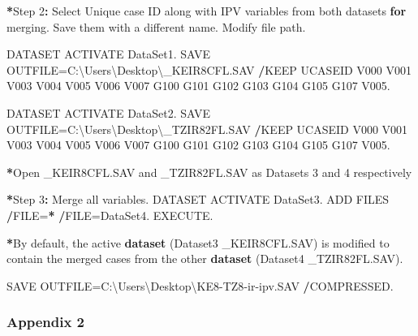 \documentclass[
]{article}
\newenvironment{Shaded}{\begin{snugshade}}{\end{snugshade}}
\newcommand{\ControlFlowTok}[1]{\textcolor[rgb]{0.13,0.29,0.53}{\textbf{#1}}}
\newcommand{\DecValTok}[1]{\textcolor[rgb]{0.00,0.00,0.81}{#1}}
\newcommand{\ErrorTok}[1]{\textcolor[rgb]{0.64,0.00,0.00}{\textbf{#1}}}
\newcommand{\FunctionTok}[1]{\textcolor[rgb]{0.13,0.29,0.53}{\textbf{#1}}}
\newcommand{\NormalTok}[1]{#1}
\newcommand{\OtherTok}[1]{\textcolor[rgb]{0.56,0.35,0.01}{#1}}
\newcommand{\SpecialCharTok}[1]{\textcolor[rgb]{0.81,0.36,0.00}{\textbf{#1}}}
\newcommand{\StringTok}[1]{\textcolor[rgb]{0.31,0.60,0.02}{#1}}
\begin{document}
\begin{Shaded}
\begin{Highlighting}[]
\SpecialCharTok{*}\NormalTok{Step }\DecValTok{2}\SpecialCharTok{:}\NormalTok{ Select Unique case ID along with IPV variables from both datasets }\ControlFlowTok{for}\NormalTok{ merging. Save them with a different name. Modify file path.}

\NormalTok{DATASET ACTIVATE DataSet1.}
\NormalTok{SAVE OUTFILE}\OtherTok{=}\StringTok{\textquotesingle{}C:\textbackslash{}Users\textbackslash{}Desktop\textbackslash{}\_KEIR8CFL.SAV\textquotesingle{}}
  \SpecialCharTok{/}\NormalTok{KEEP UCASEID V000 V001 V003 V004 V005 V006 V007 G100 G101 G102 G103 G104 G105 G107 V005.}

\NormalTok{DATASET ACTIVATE DataSet2.}
\NormalTok{SAVE OUTFILE}\OtherTok{=}\StringTok{\textquotesingle{}C:\textbackslash{}Users\textbackslash{}Desktop\textbackslash{}\_TZIR82FL.SAV\textquotesingle{}}
  \SpecialCharTok{/}\NormalTok{KEEP UCASEID V000 V001 V003 V004 V005 V006 V007 G100 G101 G102 G103 G104 G105 G107 V005.}

\SpecialCharTok{*}\NormalTok{Open \_KEIR8CFL.SAV and \_TZIR82FL.SAV as Datasets }\DecValTok{3}\NormalTok{ and }\DecValTok{4}\NormalTok{ respectively}


\SpecialCharTok{*}\NormalTok{Step }\DecValTok{3}\SpecialCharTok{:}\NormalTok{ Merge all variables.}
\NormalTok{DATASET ACTIVATE DataSet3.}
\NormalTok{ADD FILES }\SpecialCharTok{/}\NormalTok{FILE}\OtherTok{=}\ErrorTok{*}
  \ErrorTok{/}\NormalTok{FILE}\OtherTok{=}\StringTok{\textquotesingle{}DataSet4\textquotesingle{}}\NormalTok{.}
\NormalTok{EXECUTE.}

\SpecialCharTok{*}\NormalTok{By default, the active }\FunctionTok{dataset}\NormalTok{ (Dataset3 \_KEIR8CFL.SAV) is modified to contain the merged cases from the other }\FunctionTok{dataset}\NormalTok{ (Dataset4  \_TZIR82FL.SAV).}


\NormalTok{SAVE OUTFILE}\OtherTok{=}\StringTok{\textquotesingle{}C:\textbackslash{}Users\textbackslash{}Desktop\textbackslash{}KE8{-}TZ8{-}ir{-}ipv.SAV\textquotesingle{}}
  \SpecialCharTok{/}\NormalTok{COMPRESSED.}
\end{Highlighting}
\end{Shaded}

\subsubsection{Appendix 2}\label{appendix-2}
\end{document}
